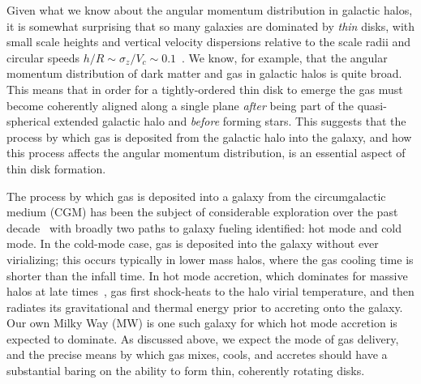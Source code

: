\documentclass[fleqn,usenatbib]{mnras}
\begin{document}
Given what we know about the angular momentum distribution in galactic halos, it is somewhat surprising that so many galaxies are dominated by {\em thin} disks, with small scale heights and vertical velocity dispersions relative to the scale radii and circular speeds $h/R \sim \sigma_z/V_c \sim 0.1$~\citep[][]{Kregel2002}.
We know, for example, that the angular momentum distribution of dark matter \citep{B01} and gas \citep{Stewart2013,DeFelippis2020} in galactic halos is quite broad.
This means that in order for a tightly-ordered thin disk to emerge the gas must become coherently aligned along a single plane \textit{after} being part of the quasi-spherical extended galactic halo and \textit{before} forming stars.
This suggests that the process by which gas is deposited from the galactic halo into the galaxy, and how this process affects the angular momentum distribution, is an essential aspect of thin disk formation.

The process by which gas is deposited into a galaxy from the circumgalactic medium (CGM) has been the subject of considerable exploration over the past decade~\citep[e.g.][]{Keres2005, Dekel2006, Keres2009, Angles-Alcazar2017, Martin2019a} with broadly two paths to galaxy fueling identified: hot mode and cold mode.
In the cold-mode case, gas is deposited into the galaxy without ever virializing; this occurs typically in lower mass halos, where the gas cooling time is shorter than the infall time.
In hot mode accretion, which dominates for massive halos at late times~\citep[e.g.][]{VandeVoort2011, VandeVoort2012a, Joung2012, Murante2012, Nelson2013}, gas first shock-heats to the halo virial temperature, and then radiates its gravitational and thermal energy prior to accreting onto the galaxy.
Our own Milky Way (MW) is one such galaxy for which hot mode accretion is expected to dominate.
As discussed above, we expect the mode of gas delivery, and the precise means by which gas mixes, cools, and accretes should have a substantial baring on the ability to form thin, coherently rotating disks.  
\end{document}
